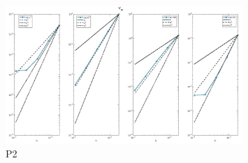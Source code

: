 \documentclass[9pt]{beamer}
\begin{document}
\begin{frame}
\begin{columns}
\begin{column}{0.5\textwidth}
\begin{figure}[h]
    \end{figure}
    \vspace{-4mm}
    \begin{figure}[h]
	\includegraphics[width=0.8\textwidth]{P2_Vm_1.jpg} \caption{P2}
	\end{figure}
    \end{column}
\end{columns}
\end{frame}
\end{document}
